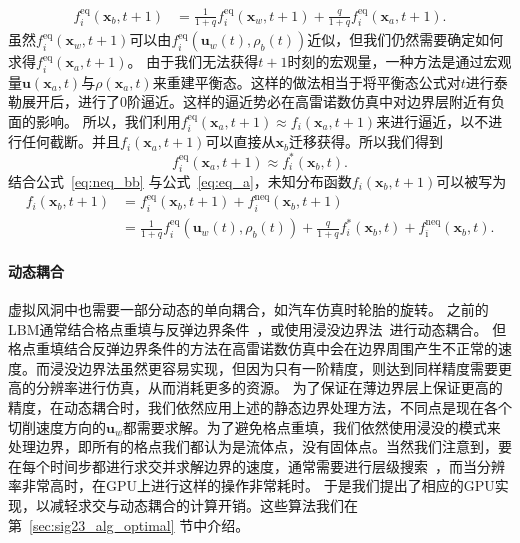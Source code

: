 \begin{align}
f^\text{eq}_i(\bm{x}_b, t\!+\!1) &= \frac{1}{1+q}f^\text{eq}_{i}(\bm{x}_w, t\!+\!1) + \frac{q}{1+q}f^\text{eq}_{i}(\bm{x}_a, t\!+\!1).
\end{align}
虽然$f^\text{eq}_{i}(\bm{x}_w, t\!+\!1)$可以由$f_{i}^\text{eq}(\bm{u}_w(t), \rho_b(t))$近似，但我们仍然需要确定如何求得$f^\text{eq}_{i}(\bm{x}_a, t\!+\!1)$。
由于我们无法获得$t+1$时刻的宏观量，一种方法是通过宏观量$\bm{u}(\bm{x}_a, t)$与$\rho(\bm{x}_a, t)$来重建平衡态。这样的做法相当于将平衡态公式对$t$进行泰勒展开后，进行了0阶逼近。这样的逼近势必在高雷诺数仿真中对边界层附近有负面的影响。
所以，我们利用$f^\text{eq}_{i}(\bm{x}_a, t\!+\!1) \approx f_{i}(\bm{x}_a, t\!+\!1)$来进行逼近，以不进行任何截断。并且$f_{i}(\bm{x}_a, t\!+\!1)$可以直接从$\bm{x}_b$迁移获得。所以我们得到
\begin{equation}
\label{eq:eq_a}
f^\text{eq}_{i}(\bm{x}_a, t\!+\!1) \approx f^{*}_{i}(\bm{x}_b, t).
\end{equation}
结合公式~\ref{eq:neq_bb} 与公式~\ref{eq:eq_a}，未知分布函数$f_i(\bm{x}_b, t\!+\!1)$可以被写为
\begin{align}
f_i(\bm{x}_b, t\!+\!1) &= f^\text{eq}_i(\bm{x}_b, t\!+\!1) + f^\text{neq}_{i}(\bm{x}_b, t\!+\!1) \\
&= \frac{1}{1\!+\!q}f_{i}^\text{eq}(\bm{u}_w(t), \rho_b(t)) + \frac{q}{1\!+\!q}f^{*}_{i}(\bm{x}_b, t) + f^\text{neq}_{\bar{\imath}}(\bm{x}_b, t).\nonumber
\end{align}

\paragraph{动态耦合}
虚拟风洞中也需要一部分动态的单向耦合，如汽车仿真时轮胎的旋转。
之前的LBM通常结合格点重填与反弹边界条件~\citep{Tao-2016}，或使用浸没边界法~\citep{Li-2016, Li-2020}进行动态耦合。
但格点重填结合反弹边界条件的方法在高雷诺数仿真中会在边界周围产生不正常的速度。而浸没边界法虽然更容易实现，但因为只有一阶精度，则达到同样精度需要更高的分辨率进行仿真，从而消耗更多的资源。
为了保证在薄边界层上保证更高的精度，在动态耦合时，我们依然应用上述的静态边界处理方法，不同点是现在各个切削速度方向的$\bm{u}_w$都需要求解。为了避免格点重填，我们依然使用浸没的模式来处理边界，即所有的格点我们都认为是流体点，没有固体点。当然我们注意到，要在每个时间步都进行求交并求解边界的速度，通常需要进行层级搜索~\citep{Karras-2012}，而当分辨率非常高时，在GPU上进行这样的操作非常耗时。
于是我们提出了相应的GPU实现，以减轻求交与动态耦合的计算开销。这些算法我们在第~\ref{sec:sig23_alg_optimal} 节中介绍。

